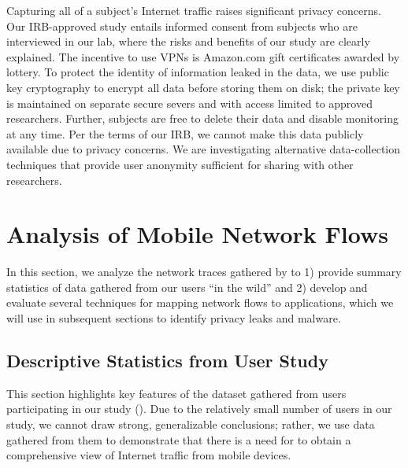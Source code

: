 Capturing all of a subject's Internet traffic raises significant
privacy concerns.  Our IRB-approved study entails informed consent
from subjects who are interviewed in our lab, where the risks and
benefits of our study are clearly explained.  The incentive to use
VPNs is Amazon.com gift certificates awarded by lottery. To protect the
identity of information leaked in the data, we use public key
cryptography to encrypt all data before storing them 
on disk; the private key is
maintained on separate secure severs and with access limited to
approved researchers.  Further, subjects are free to delete their
data and disable monitoring at any time.  Per the terms of our IRB, we cannot 
make this data publicly available due to privacy concerns. We are investigating 
alternative data-collection techniques that provide user anonymity sufficient 
for sharing with other researchers.

\section{Analysis of Mobile Network Flows}

In this section, we analyze the network traces gathered by \meddle to 
1) provide summary statistics of data gathered from our 
users ``in the wild'' and
2) develop and evaluate several techniques for mapping network flows to 
applications, which we will use in subsequent sections to identify privacy 
leaks and malware.

\subsection{Descriptive Statistics from User Study}

This section highlights key features of the dataset gathered from 
users participating in our study (\mobWild). 
Due to the relatively small number of users in our study, we cannot 
draw strong, generalizable conclusions; rather, we use data gathered 
from them to demonstrate that there is a need for \meddle to 
obtain a comprehensive view of Internet traffic from mobile devices. 

